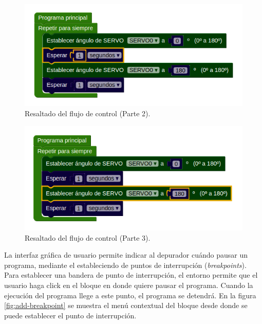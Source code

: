 \begin{figure}[!htbp]
	\begin{center}  %
		\includegraphics[scale=.60]{./Figures/debugPaso2.PNG}
		\par\caption{Resaltado del flujo de control (Parte 2).}\label{fig:debugPaso2}
	\end{center}
\end{figure}

\begin{figure}[!htbp]
	\begin{center}  %
		\includegraphics[scale=.60]{./Figures/debugPaso3.PNG}
		\par\caption{Resaltado del flujo de control (Parte 3).}\label{fig:debugPaso3}
	\end{center}
\end{figure}

La interfaz gráfica de usuario permite indicar al depurador cuándo pausar un programa, mediante el estableciendo de puntos de interrupción (\emph{breakpoints}).
Para establecer una bandera de punto de interrupción, el entorno permite que el usuario haga click en el bloque en donde quiere pausar el programa. Cuando la ejecución del programa llege a este punto, el programa se detendrá. En la figura \ref{fig:add-breakpoint} se muestra el menú contextual del bloque desde donde se puede establecer el punto de interrupción.

